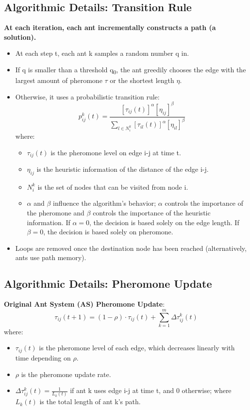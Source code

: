 \subsection*{Algorithmic Details: Transition Rule}
\textbf{At each iteration, each ant incrementally constructs a path (a solution).}
\begin{itemize}
\item At each step t, each ant k samples a random number q in.
    \item If q is smaller than a threshold q\textsubscript{0}, the ant greedily chooses the edge with the largest amount of pheromone $ \tau $ or the shortest length $ \eta$.
    \item Otherwise, it uses a probabilistic transition rule:
    $$ p_{ij}^{k}(t) = \frac{[\tau_{ij}(t)]^\alpha [\eta_{ij}]^\beta}{\sum_{l \in N_i^k} [\tau_{il}(t)]^\alpha [\eta_{il}]^\beta} $$
    where:
    \begin{itemize}
       \item $\tau_{ij}(t)$ is the pheromone level on edge i-j at time t.
        \item $\eta_{ij}$ is the heuristic information of the distance of the edge i-j.
        \item  $N_i^k$ is the set of nodes that can be visited from node i.
        \item  $ \alpha $ and $ \beta $ influence the algorithm’s behavior; $\alpha$ controls the importance of the pheromone and $ \beta $ controls the importance of the heuristic information. If $ \alpha = 0$, the decision is based solely on the edge length. If $ \beta = 0$, the decision is based solely on pheromone.
    \end{itemize}
    \item Loops are removed once the destination node has been reached (alternatively, ants use path memory).
\end{itemize}
\subsection*{Algorithmic Details: Pheromone Update}
\textbf{Original Ant System (AS) Pheromone Update}:
$$
\tau_{ij}(t+1) = (1-\rho)\cdot\tau_{ij}(t) + \sum_{k=1}^{m}\Delta\tau_{ij}^{k}(t)
$$
    where:
     \begin{itemize}
         \item $ \tau_{ij}(t) $ is the pheromone level of each edge, which decreases linearly with time depending on $ \rho $.
         \item  $ \rho $ is the pheromone update rate.
         \item $\Delta\tau_{ij}^{k}(t) = \frac{1}{L_k(t)}$ if ant k uses edge i-j at time t, and 0 otherwise; where $L_k(t)$ is the total length of ant k's path.
    \end{itemize}

